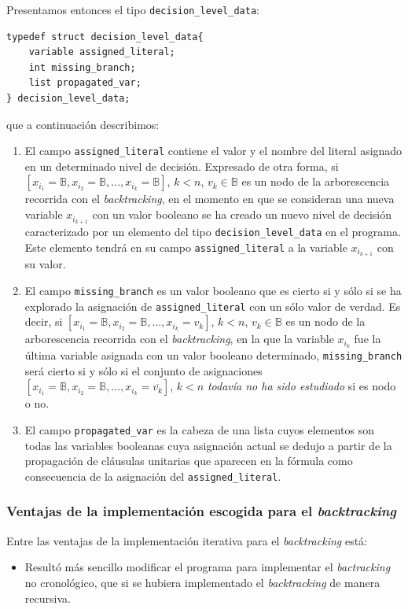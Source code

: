 \documentclass[12pt,lettersize,oneside]{article}
\begin{document}
Presentamos entonces el tipo {\tt decision\_level\_data}:

\begin{lstlisting}
typedef struct decision_level_data{
    variable assigned_literal;
    int missing_branch;                                                
    list propagated_var;
} decision_level_data;
\end{lstlisting}
que a continuación describimos:
\vspace{-2.5mm}
\begin{enumerate}
\item El campo {\tt assigned\_literal} contiene el valor y el nombre del literal
  asignado en un determinado nivel de decisión. Expresado de otra forma, si
  $[x_{i_1}=\mathbb{B},x_{i_2}=\mathbb{B},\ldots, x_{i_k} = \mathbb{B} ]$, $k<
  n$, $v_k \in \mathbb{B}$ es un nodo de la arborescencia recorrida con el
  \emph{backtracking}, en el momento en que se consideran una nueva variable
  $x_{i_{k+1}}$ con un valor booleano se ha creado un nuevo nivel de decisión
  caracterizado por un elemento del tipo {\tt decision\_level\_data} en el
  programa. Este elemento tendrá en su campo {\tt assigned\_literal} a la
  variable $x_{i_{k+1}}$ con su valor.
\item El campo {\tt missing\_branch} es un valor booleano que es cierto si y
  sólo si se ha explorado la asignación de {\tt assigned\_literal} con un
  sólo valor de verdad. Es decir, si
  $[x_{i_1}=\mathbb{B},x_{i_2}=\mathbb{B},\ldots, x_{i_k} = v_k ]$, $k< n$, $v_k
  \in \mathbb{B}$ es un nodo de la arborescencia recorrida con el
  \emph{backtracking}, en la que la variable $x_{i_k}$ fue la última variable
  asignada con un valor booleano determinado, {\tt missing\_branch} será cierto
  si y sólo si el conjunto de asignaciones
  $[x_{i_1}=\mathbb{B},x_{i_2}=\mathbb{B},\ldots, x_{i_k} = \overline{v_k} ]$,
  $k<n$ \emph{todavía no ha sido estudiado} si es nodo o no.
\item El campo {\tt propagated\_var} es la cabeza de una lista cuyos elementos
  son todas las variables booleanas cuya asignación actual se dedujo a partir de
  la propagación de cláusulas unitarias que aparecen en la fórmula como
  consecuencia de la asignación del {\tt assigned\_literal}.
\end{enumerate}

\subsubsection{Ventajas de la implementación escogida para el
  \emph{backtracking}}\label{VentajasBacktracking}
Entre las ventajas de la implementación iterativa para el \emph{backtracking} está:
\vspace{-2.5mm}
\begin{itemize}
  \item Resultó más sencillo modificar el programa para implementar el
    \emph{bactracking} no cronológico, que si se hubiera implementado el
    \emph{backtracking} de manera recursiva.
\end{itemize}
\end{document}
